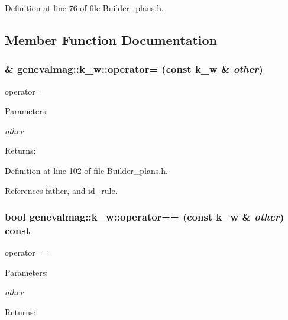 Definition at line 76 of file Builder\_\-plans.h.

\subsection{Member Function Documentation}
\hypertarget{structgenevalmag_1_1k__w_60b600d54504f37f1abb332481ae3886}{
\subsubsection[{operator=}]{\& genevalmag::k\_\-w::operator= (const {\bf k\_\-w} \& {\em other})}}
\label{structgenevalmag_1_1k__w_60b600d54504f37f1abb332481ae3886}


operator= \begin{Desc}
\item[Parameters:]
\begin{description}
\item[{\em other}]\end{description}
\end{Desc}
\begin{Desc}
\item[Returns:]\end{Desc}


Definition at line 102 of file Builder\_\-plans.h.

References father, and id\_\-rule.\hypertarget{structgenevalmag_1_1k__w_bfdaef873a635401975794595679a251}{
\subsubsection[{operator==}]{\setlength{\rightskip}{0pt plus 5cm}bool genevalmag::k\_\-w::operator== (const {\bf k\_\-w} \& {\em other}) const}}
\label{structgenevalmag_1_1k__w_bfdaef873a635401975794595679a251}


operator== \begin{Desc}
\item[Parameters:]
\begin{description}
\item[{\em other}]\end{description}
\end{Desc}
\begin{Desc}
\item[Returns:]\end{Desc}


